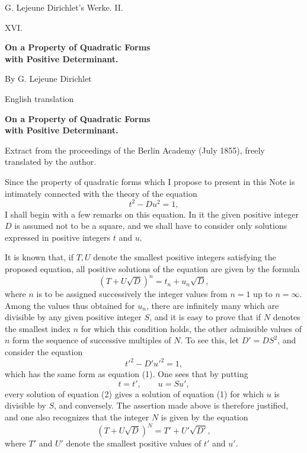 \documentclass[11pt]{article}
\begin{document}
\begin{center}
{\Large G. Lejeune Dirichlet's Werke. II.}\par\vspace{1.2em}
{\Large XVI.}\par\vspace{0.5em}
{\LARGE \textbf{On a Property of Quadratic Forms\\ with Positive Determinant.}}\par\vspace{1em}
{\large By G. Lejeune Dirichlet}\par\vspace{0.5em}
{\small English translation}
\end{center}

\begin{center}
{\large \textbf{On a Property of Quadratic Forms\\ with Positive Determinant.}}\par
{\small Extract from the proceedings of the Berlin Academy (July 1855), freely translated by the author.}
\end{center}

Since the property of quadratic forms which I propose to present in this Note is intimately connected with the theory of the equation
\[
\tag{1} t^2-Du^2=1,
\]
I shall begin with a few remarks on this equation. In it the given positive integer \(D\) is assumed not to be a square, and we shall have to consider only solutions expressed in positive integers \(t\) and \(u\).

It is known that, if \(T,U\) denote the smallest positive integers satisfying the proposed equation, all positive solutions of the equation are given by the formula
\[
(T+U\sqrt D)^n=t_n+u_n\sqrt D,
\]
where \(n\) is to be assigned successively the integer values from \(n=1\) up to \(n=\infty\). Among the values thus obtained for \(u_n\), there are infinitely many which are divisible by any given positive integer \(S\), and it is easy to prove that if \(N\) denotes the smallest index \(n\) for which this condition holds, the other admissible values of \(n\) form the sequence of successive multiples of \(N\). To see this, let \(D'=DS^2\), and consider the equation
\[
\tag{2} t'^2-D'u'^2=1,
\]
which has the same form as equation (1). One sees that by putting
\[
t=t',\qquad u=Su',
\]
every solution of equation (2) gives a solution of equation (1) for which \(u\) is divisible by \(S\), and conversely. The assertion made above is therefore justified, and one also recognizes that the integer \(N\) is given by the equation
\[
(T+U\sqrt D)^N=T'+U'\sqrt{D'},
\]
where \(T'\) and \(U'\) denote the smallest positive values of \(t'\) and \(u'\).
\end{document}

